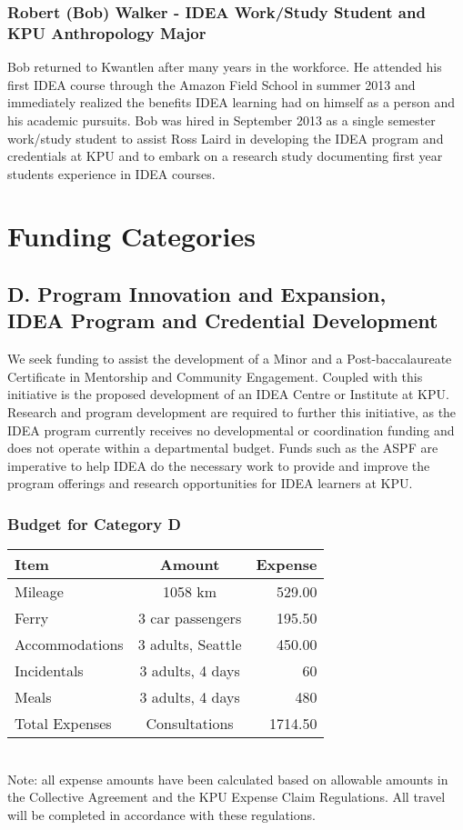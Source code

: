 \documentclass[11pt, letterpaper]{article}
\begin{document}
\subsubsection{Robert (Bob) Walker - IDEA Work/Study Student and KPU
Anthropology Major}

Bob returned to Kwantlen after many years in the workforce. He attended
his first IDEA course through the Amazon Field School in summer 2013 and
immediately realized the benefits IDEA learning had on himself as a
person and his academic pursuits. Bob was hired in September 2013 as a
single semester work/study student to assist Ross Laird in developing
the IDEA program and credentials at KPU and to embark on a research
study documenting first year students experience in IDEA courses.

\section{Funding Categories}

\subsection{D. Program Innovation and Expansion,\\
IDEA Program and Credential Development}

We seek funding to assist the development of a Minor and a Post-baccalaureate Certificate in Mentorship and Community Engagement.
Coupled with this initiative is the proposed development of an IDEA
Centre or Institute at KPU. Research and program development are
required to further this initiative, as the IDEA program currently
receives no developmental or coordination funding and does not operate
within a departmental budget. Funds such as the ASPF are imperative to
help IDEA do the necessary work to provide and improve the program
offerings and research opportunities for IDEA learners at KPU.

\subsubsection{Budget for Category D}


\begin{tabular}{|l|c|r|}
\hline
Item & Amount & Expense \\
\hline
Mileage & 1058 km & 529.00\\
Ferry & 3 car passengers & 195.50\\
Accommodations & 3 adults, Seattle & 450.00\\
Incidentals & 3 adults, 4 days & 60\\
Meals & 3 adults, 4 days & 480\\
\hline
Total Expenses & Consultations & 1714.50\\
\hline
\end{tabular}
\\[1em]
Note: all expense amounts have been calculated based on allowable amounts in the Collective Agreement and the KPU Expense Claim Regulations. All travel will be completed in accordance with these regulations.
\end{document}

